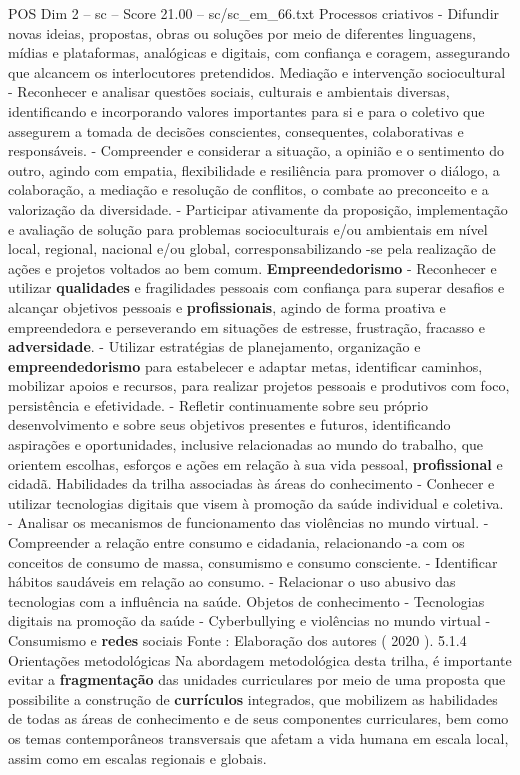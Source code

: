 \begin{textsample}{POS Dim 2 – sc – Score 21.00 – sc/sc\_em\_66.txt}
Processos criativos - Difundir novas ideias, propostas, obras ou soluções por meio de diferentes linguagens, mídias e plataformas, analógicas e digitais, com confiança e coragem, assegurando que alcancem os interlocutores pretendidos.
Mediação e intervenção sociocultural - Reconhecer e analisar questões sociais, culturais e ambientais diversas, identificando e incorporando valores importantes para si e para o coletivo que assegurem a tomada de decisões conscientes, consequentes, colaborativas e responsáveis. - Compreender e considerar a situação, a opinião e o sentimento do outro, agindo com empatia, flexibilidade e resiliência para promover o diálogo, a colaboração, a mediação e resolução de conflitos, o combate ao preconceito e a valorização da diversidade. - Participar ativamente da proposição, implementação e avaliação de solução para problemas socioculturais e/ou ambientais em nível local, regional, nacional e/ou global, corresponsabilizando -se pela realização de ações e projetos voltados ao bem comum. \textbf{Empreendedorismo} - Reconhecer e utilizar \textbf{qualidades} e fragilidades pessoais com confiança para superar desafios e alcançar objetivos pessoais e \textbf{profissionais}, agindo de forma proativa e empreendedora e perseverando em situações de estresse, frustração, fracasso e \textbf{adversidade}. - Utilizar estratégias de planejamento, organização e \textbf{empreendedorismo} para estabelecer e adaptar metas, identificar caminhos, mobilizar apoios e recursos, para realizar projetos pessoais e produtivos com foco, persistência e efetividade. - Refletir continuamente sobre seu próprio desenvolvimento e sobre seus objetivos presentes e futuros, identificando aspirações e oportunidades, inclusive relacionadas ao mundo do trabalho, que orientem escolhas, esforços e ações em relação à sua vida pessoal, \textbf{profissional} e cidadã.
Habilidades da trilha associadas às áreas do conhecimento - Conhecer e utilizar tecnologias digitais que visem à promoção da saúde individual e coletiva. - Analisar os mecanismos de funcionamento das violências no mundo virtual. - Compreender a relação entre consumo e cidadania, relacionando -a com os conceitos de consumo de massa, consumismo e consumo consciente. - Identificar hábitos saudáveis em relação ao consumo. - Relacionar o uso abusivo das tecnologias com a influência na saúde.
Objetos de conhecimento - Tecnologias digitais na promoção da saúde - Cyberbullying e violências no mundo virtual - Consumismo e \textbf{redes} sociais Fonte : Elaboração dos autores ( 2020 ). 5.1.4 Orientações metodológicas Na abordagem metodológica desta trilha, é importante evitar a \textbf{fragmentação} das unidades curriculares por meio de uma proposta que possibilite a construção de \textbf{currículos} integrados, que mobilizem as habilidades de todas as áreas de conhecimento e de seus componentes curriculares, bem como os temas contemporâneos transversais que afetam a vida humana em escala local, assim como em escalas regionais e globais.

\end{textsample}
